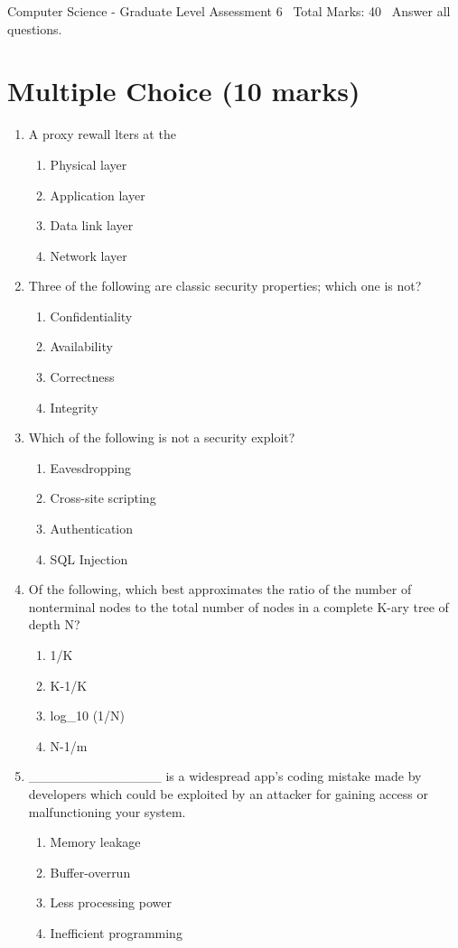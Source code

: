 \documentclass[12pt]{article}
\begin{document}
\begin{center}
Computer Science - Graduate Level Assessment 6 \
Total Marks: 40 \
Answer all questions.
\end{center}

\section*{Multiple Choice (10 marks)}
\begin{enumerate}[label=\arabic*.]
\item A proxy rewall lters at the
\begin{enumerate}[label=(\alph*)]
    \item Physical layer
    \item Application layer
    \item Data link layer
    \item Network layer
\end{enumerate}
\item Three of the following are classic security properties; which one is not?
\begin{enumerate}[label=(\alph*)]
    \item Confidentiality
    \item Availability
    \item Correctness
    \item Integrity
\end{enumerate}
\item Which of the following is not a security exploit?
\begin{enumerate}[label=(\alph*)]
    \item Eavesdropping
    \item Cross-site scripting
    \item Authentication
    \item SQL Injection
\end{enumerate}
\item Of the following, which best approximates the ratio of the number of nonterminal nodes to the total number of nodes in a complete K-ary tree of depth N?
\begin{enumerate}[label=(\alph*)]
    \item 1/K
    \item K-1/K
    \item log\_10 (1/N)
    \item N-1/m
\end{enumerate}
\item \_\_\_\_\_\_\_\_\_\_\_\_\_\_ is a widespread app's coding mistake made by developers which could be exploited by an attacker for gaining access or malfunctioning your system.
\begin{enumerate}[label=(\alph*)]
    \item Memory leakage
    \item Buffer-overrun
    \item Less processing power
    \item Inefficient programming
\end{enumerate}
\end{enumerate}
\end{document}
